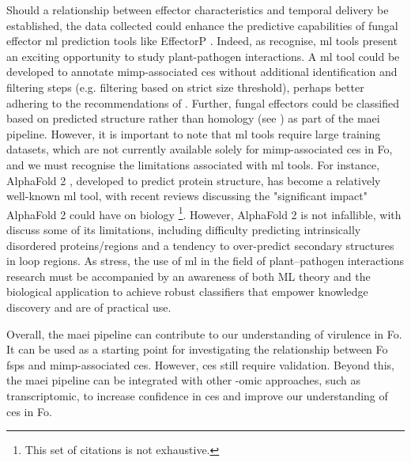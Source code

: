 Should a relationship between effector characteristics and temporal delivery be established, the data collected could enhance the predictive capabilities of fungal effector \ac{ml} prediction tools like EffectorP \parencite{Sperschneider2022}. Indeed, as \textcite{Sperschneider2020} recognise, \ac{ml} tools present an exciting opportunity to study plant-pathogen interactions. A \ac{ml} tool could be developed to annotate \ac{mimp}-associated \acp{ce} without additional identification and filtering steps (e.g. filtering based on strict size threshold), perhaps better adhering to the recommendations of \textcite{Sperschneider2015, LoPresti2015, Todd2022}. Further, fungal effectors could be classified based on predicted structure rather than homology (see \textcite{Seong2023}) as part of the \ac{maei} pipeline. However, it is important to note that \ac{ml} tools require large training datasets, which are not currently available solely for \ac{mimp}-associated \acp{ce} in \ac{Fo}, and we must recognise the limitations associated with \ac{ml} tools. For instance, AlphaFold 2 \parencite{Jumper2021}, developed to predict protein structure, has become a relatively well-known \ac{ml} tool, with recent reviews discussing the "significant impact" \parencite{Yang2023} AlphaFold 2 could have on biology \parencite{Skolnick2021, Marcu2022, Varadi2023}\footnote{This set of citations is not exhaustive.}. However, AlphaFold 2 is not infallible, with \textcite{Bertoline2023} discuss some of its limitations, including difficulty predicting intrinsically disordered proteins/regions and a tendency to over-predict secondary structures in loop regions. As \textcite{Sperschneider2020} stress, the use of \ac{ml} in the  field of plant–pathogen interactions research must be accompanied by an awareness of both ML theory and the biological application to achieve robust classifiers that empower knowledge discovery and are of practical use. 


Overall, the \ac{maei} pipeline can contribute to our understanding of virulence in \ac{Fo}. It can be used as a starting point for investigating the relationship between \ac{Fo} \acp{fsp} and \ac{mimp}-associated \acp{ce}. However, \acp{ce} still require validation. Beyond this, the \ac{maei} pipeline can be integrated with other -omic approaches, such as transcriptomic, to increase confidence in \acp{ce} and improve our understanding of \acp{ce} in \ac{Fo}. 

